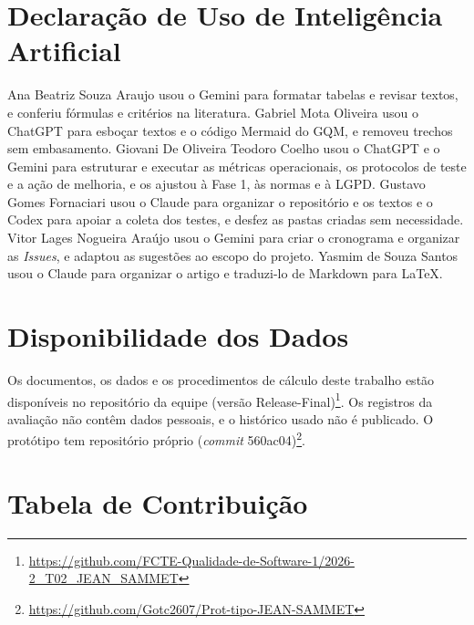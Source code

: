 \documentclass[12pt]{article}
\begin{document}
\section*{Declaração de Uso de Inteligência Artificial}

Ana Beatriz Souza Araujo usou o Gemini para formatar tabelas e revisar textos, e
conferiu fórmulas e critérios na literatura. Gabriel Mota Oliveira usou o ChatGPT
para esboçar textos e o código Mermaid do GQM, e removeu trechos sem embasamento.
Giovani De Oliveira Teodoro Coelho usou o ChatGPT e o Gemini para estruturar e
executar as métricas operacionais, os protocolos de teste e a ação de melhoria, e os
ajustou à Fase 1, às normas e à LGPD. Gustavo Gomes Fornaciari usou o Claude para
organizar o repositório e os textos e o Codex para apoiar a coleta dos testes, e
desfez as pastas criadas sem necessidade. Vitor Lages Nogueira Araújo
usou o Gemini para criar o cronograma e organizar as \textit{Issues}, e adaptou as
sugestões ao escopo do projeto. Yasmim de Souza Santos usou o Claude para organizar o
artigo e traduzi-lo de Markdown para LaTeX.

\section*{Disponibilidade dos Dados}

Os documentos, os dados e os procedimentos de cálculo deste trabalho estão
disponíveis no repositório da equipe (versão
Release-Final)\footnote{\url{https://github.com/FCTE-Qualidade-de-Software-1/2026-2_T02_JEAN_SAMMET}}.
Os registros da avaliação não contêm dados pessoais, e o histórico usado não é
publicado. O protótipo tem repositório próprio (\textit{commit}
560ac04)\footnote{\url{https://github.com/Gotc2607/Prot-tipo-JEAN-SAMMET}}.




\clearpage
\appendix

\section{Tabela de Contribuição}\label{ap:contribuicao}
\end{document}
